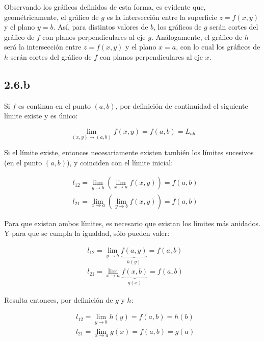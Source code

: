 \documentclass{article}
\begin{document}
Observando los gráficos definidos de esta forma, es evidente que, geométricamente, el gráfico de $g$ es la intersección entre la superficie $z = f(x,y)$ y el plano $y = b$. Así, para distintos valores de $b$, los gráficos de $g$ serán cortes del gráfico de $f$ con planos perpendiculares al eje $y$. Análogamente, el gráfico de $h$ será la intersección entre $z = f(x,y)$ y el plano $x = a$, con lo cual los gráficos de $h$ serán cortes del gráfico de $f$ con planos perpendiculares al eje $x$.

\subsection*{2.6.b}
\label{subsec:2.6.b}

Si $f$ es continua en el punto $(a,b)$, por definición de continuidad el siguiente límite existe y es único:

\begin{equation}
\lim_{(x,y) \rightarrow (a,b)} f(x,y) = f(a,b) = L_{ab}
\end{equation}

Si el límite existe, entonces necesariamente existen también los límites sucesivos (en el punto $(a,b)$), y coinciden con el límite inicial:

\begin{subequations}
\begin{align}
& l_{12} = \lim_{y \rightarrow b} \left( \lim_{x \rightarrow a} f(x,y) \right) = f(a,b) \\
& l_{21} = \lim_{x \rightarrow a} \left( \lim_{y \rightarrow b} f(x,y) \right) = f(a,b)
\end{align}
\end{subequations}

Para que existan ambos límites, es necesario que existan los límites más anidados. Y para que se cumpla la igualdad, sólo pueden valer:

\begin{subequations}
\begin{align}
& l_{12} = \lim_{y \rightarrow b} \underbrace{f(a,y)}_{h(y)} = f(a,b) \\
& l_{21} = \lim_{x \rightarrow a} \underbrace{f(x,b)}_{g(x)} = f(a,b)
\end{align}
\end{subequations}

Resulta entonces, por definición de $g$ y $h$:

\begin{subequations}
\begin{align}
& l_{12} = \lim_{y \rightarrow b} h(y) = f(a,b) = h(b) \\
& l_{21} = \lim_{x \rightarrow a} g(x) = f(a,b) = g(a)
\end{align}
\end{subequations}
\end{document}
